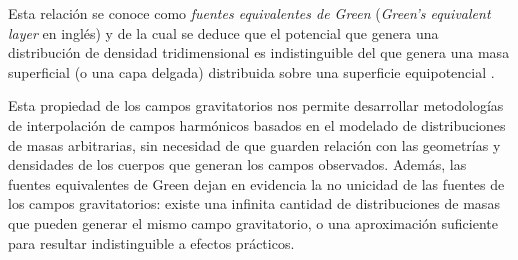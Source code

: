 Esta relación se conoce como \emph{fuentes equivalentes de Green}
(\emph{Green's equivalent layer} en inglés) y de la cual se deduce que el
potencial que genera una distribución de densidad tridimensional es
indistinguible del que genera una masa superficial (o una capa delgada)
distribuida sobre una superficie equipotencial \citep[][p.~62]{blakely1995}.

Esta propiedad de los campos gravitatorios nos permite desarrollar metodologías
de interpolación de campos harmónicos basados en el modelado de distribuciones
de masas arbitrarias, sin necesidad de que guarden relación con las geometrías
y densidades de los cuerpos que generan los campos observados.
Además, las fuentes equivalentes de Green dejan en evidencia la no unicidad de
las fuentes de los campos gravitatorios: existe una infinita cantidad de
distribuciones de masas que pueden generar el mismo campo gravitatorio, o una
aproximación suficiente para resultar indistinguible a efectos prácticos.
